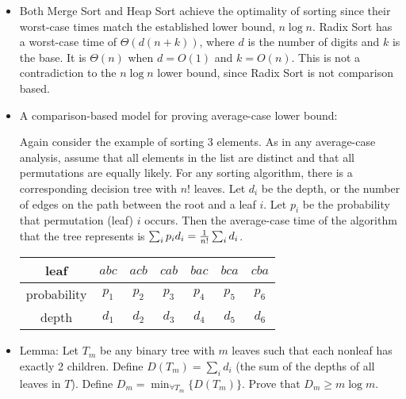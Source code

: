 \documentclass{article}
\begin{document}
\begin{itemize}
{\em Proof}\quad Let $T$ be a decision tree for any algorithm that
sorts $n$ elements by comparisons. $T$ has $n!$ leaves. So the height
of the tree, $h$, is at least $\log n!$. (Assume not. Then $h<log n!$.
By the lemma, the number of leaves in the tree is at most $2^h<2^{log n!}
=n!$, which is impossible.) So for any sorting algorithm, the worst-case
time complexity is the height of the decision tree, thus at least $\log n!
=\Omega(n\log n)$.
 
\item Both Merge Sort and Heap Sort achieve the optimality of sorting
since their worst-case times match the established lower bound, $n\log n$.
Radix Sort has a worst-case time of $\Theta(d(n+k))$, where $d$ is the number of
digits and $k$ is the base. It is $\Theta(n)$ when $d=O(1)$ and $k=O(n)$.
This is not a contradiction to the $n\log n$ lower bound, since Radix
Sort is not comparison based. 

\item A comparison-based model for proving average-case lower bound:

Again consider the example of sorting 3 elements. As in
any average-case analysis, assume that all elements in the list
are distinct and that all permutations are equally likely.
For any sorting algorithm, there is a corresponding decision tree
with $n!$ leaves. Let $d_i$ be the depth, or the number of edges on the
path between the root and a leaf $i$. Let $p_i$ be the probability 
that permutation (leaf) $i$ occurs. Then the average-case time
of the algorithm that the tree represents is $\sum_i p_id_i={1\over n!}
\sum_id_i$.

\begin{center}
\begin{tabular}{c|c|c|c|c|c|c}
leaf & $abc$ & $acb$ & $cab$ & $bac$ & $bca$ & $cba$\\\hline
probability & $p_1$ & $p_2$ & $p_3$ & $p_4$ & $p_5$ & $p_6$\\
depth & $d_1$ & $d_2$ & $d_3$ & $d_4$ & $d_5$ & $d_6$\\
\end{tabular}
\end{center}

\item Lemma: Let $T_m$ be any binary tree with $m$ leaves such that each nonleaf
has exactly 2 children. Define $D(T_m)=\sum_id_i$ (the sum of the depths of all
leaves in $T$). Define $D_m=\min_{\forall T_m}\{D(T_m)\}$. Prove that
$D_m\ge m\log m$.


\end{itemize}
\end{document}
